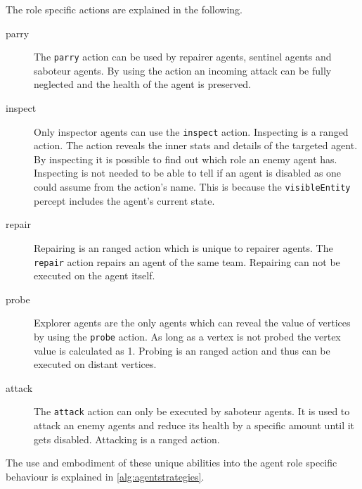 The role specific actions are explained in the following.
\begin{description}
   \item[parry] The \texttt{parry} action can be used by repairer agents, sentinel agents and saboteur agents.
    By using the action an incoming attack can be fully neglected  and the health of the agent is preserved.
   \item[inspect] Only inspector agents can use the \texttt{inspect} action. Inspecting is a ranged action.
    The action reveals the inner stats and details of the targeted agent.
    By inspecting it is possible to find out which role an enemy agent has.
    Inspecting is not needed to be able to tell if an agent is disabled as one could assume from the action's name.
    This is because the \texttt{visibleEntity} percept includes the agent's current state.
   \item[repair] Repairing is an ranged action which is unique to repairer agents. The \texttt{repair} action repairs an agent of the same team.
    Repairing can not be executed on the agent itself.
   \item[probe] Explorer agents are the only agents which can reveal the value of vertices by using the \texttt{probe} action.
    As long as a vertex is not probed the vertex value is calculated as 1. Probing is an ranged action and thus can be executed on distant vertices.
   \item[attack] The \texttt{attack} action can only be executed by saboteur agents. It is used to attack an enemy agents and reduce its health by a specific amount until it gets disabled. Attacking is a ranged action.
\end{description}

The use and embodiment of these unique abilities into the agent role specific behaviour is explained in \autoref{alg:agentstrategies}.
